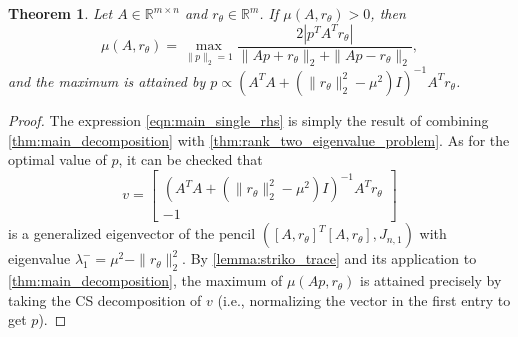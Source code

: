 \documentclass{article}
\newtheorem{theorem}{Theorem}
\newcommand{\ts}{^T}
\begin{document}
\begin{theorem}\label{thm:main_single_rhs}
    Let $A\in \mathbb{R}^{m\times n}$ and $r_\theta \in \mathbb{R}^m$. If $\mu(A, r_\theta) > 0$, then
    \begin{equation}\label{eqn:main_single_rhs}
        \mu(A,r_\theta) = \max_{\|p\|_2=1}\frac{2|p\ts A\ts r_\theta|}{\|Ap+r_\theta\|_2 + \|Ap-r_\theta\|_2},
    \end{equation}
    and the maximum is attained by $p\propto \left(A\ts A + (\|r_\theta\|_2^2 - \mu^2)I\right)^{-1}A\ts r_\theta$.
\end{theorem}
\begin{proof}
    The expression \cref{eqn:main_single_rhs} is simply the result of combining \cref{thm:main_decomposition} with \cref{thm:rank_two_eigenvalue_problem}. As for the optimal value of $p$, it can be checked that
    \begin{equation*}
        v = \begin{bmatrix}
            (A\ts A + (\|r_\theta\|_2^2 - \mu^2)I)^{-1}A\ts r_\theta \\
            -1
        \end{bmatrix}
    \end{equation*}
    is a generalized eigenvector of the pencil $([A,r_\theta]\ts[A,r_\theta], J_{n,1})$ with eigenvalue $\lambda_1^{-} = \mu^2 - \|r_\theta\|_2^2$. By \cref{lemma:striko_trace} and its application to \cref{thm:main_decomposition}, the maximum of $\mu(Ap,r_\theta)$ is attained precisely by taking the CS decomposition of $v$ (i.e., normalizing the vector in the first entry to get $p$). 
\end{proof}
\end{document}
